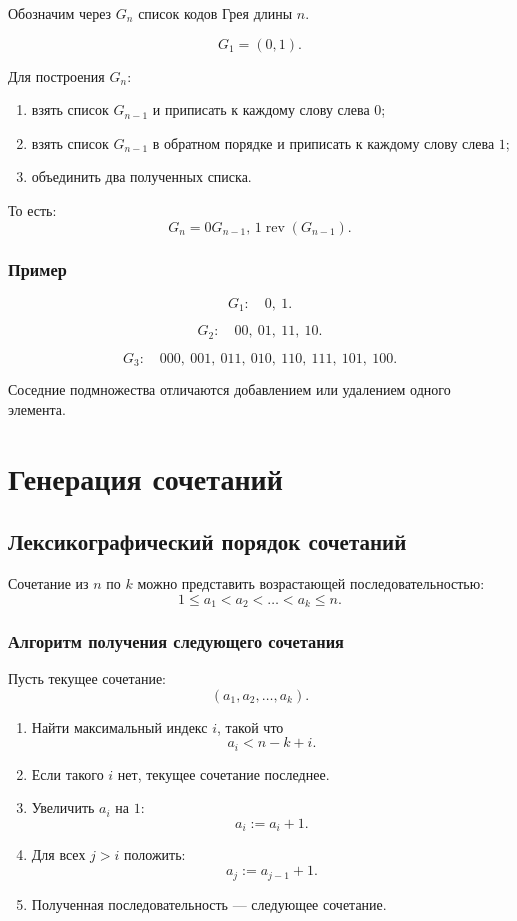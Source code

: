 \documentclass[12pt,a4paper]{article}
\begin{document}
Обозначим через $G_n$ список кодов Грея длины $n$.

\[
G_1=(0,1).
\]

Для построения $G_n$:
\begin{enumerate}
    \item взять список $G_{n-1}$ и приписать к каждому слову слева $0$;
    \item взять список $G_{n-1}$ в обратном порядке и приписать к каждому слову слева $1$;
    \item объединить два полученных списка.
\end{enumerate}

То есть:
\[
G_n = 0G_{n-1},\,1\operatorname{rev}(G_{n-1}).
\]

\subsubsection*{Пример}

\[
G_1:
\quad
0,\ 1.
\]

\[
G_2:
\quad
00,\ 01,\ 11,\ 10.
\]

\[
G_3:
\quad
000,\ 001,\ 011,\ 010,\ 110,\ 111,\ 101,\ 100.
\]

Соседние подмножества отличаются добавлением или удалением одного элемента.

\section{Генерация сочетаний}

\subsection{Лексикографический порядок сочетаний}

Сочетание из $n$ по $k$ можно представить возрастающей последовательностью:
\[
1\le a_1<a_2<\dots<a_k\le n.
\]

\subsubsection*{Алгоритм получения следующего сочетания}

Пусть текущее сочетание:
\[
(a_1,a_2,\dots,a_k).
\]

\begin{enumerate}
    \item Найти максимальный индекс $i$, такой что
    \[
    a_i < n-k+i.
    \]
    \item Если такого $i$ нет, текущее сочетание последнее.
    \item Увеличить $a_i$ на $1$:
    \[
    a_i := a_i+1.
    \]
    \item Для всех $j>i$ положить:
    \[
    a_j := a_{j-1}+1.
    \]
    \item Полученная последовательность --- следующее сочетание.
\end{enumerate}
\end{document}
